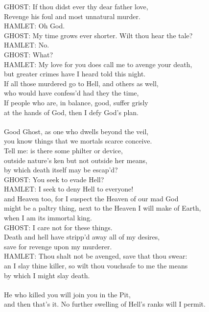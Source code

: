 \begin{playdialog}
GHOST: If thou didst ever thy dear father love,\\
Revenge his foul and most unnatural murder.\\

HAMLET: Oh God.\\

GHOST: My time grows ever shorter. Wilt thou hear the tale?\\

HAMLET: No.\\

GHOST: What?\\

HAMLET: My love for you does call me to avenge your death,\\ but greater crimes have I heard told this night.\\ If all those murdered go to Hell, and others as well,\\ who would have confess’d had they the time,\\ If people who are, in balance, good, suffer grisly\\ at the hands of God, then I defy God’s plan.\\ \\ Good Ghost, as one who dwells beyond the veil,\\ you know things that we mortals scarce conceive.\\ Tell me: is there some philter or device,\\ outside nature’s ken but not outside her means,\\ by which death itself may be escap’d?\\

GHOST: You seek to evade Hell?\\

HAMLET: I seek to deny Hell to everyone!\\
and Heaven too, for I suspect the Heaven of our mad God\\
might be a paltry thing, next to the Heaven I will make of Earth,\\ when I am its immortal king.\\

GHOST: I care not for these things.\\
Death and hell have stripp’d away all of my desires,\\
save for revenge upon my murderer.\\

HAMLET: Thou shalt not be avenged, save that thou swear:\\
an I slay thine killer, so wilt thou vouchsafe to me the means\\
by which I might slay death.\\
\\
He who killed you will join you in the Pit,\\
and then that’s it. No further swelling of Hell’s ranks will I permit.\\


\end{playdialog}
